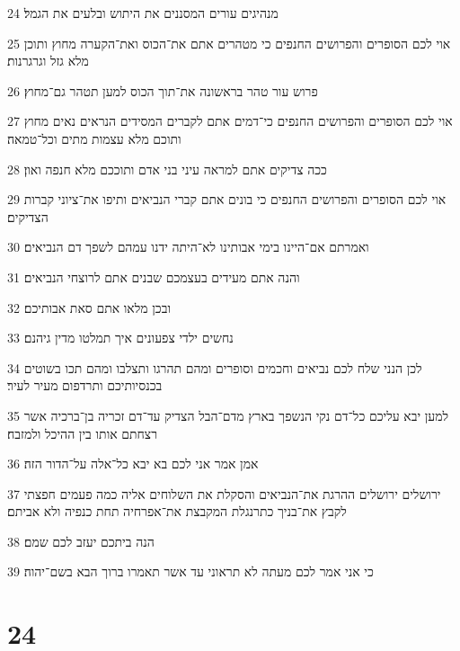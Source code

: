 \par 24 מנהיגים עורים המסננים את היתוש ובלעים את הגמל׃
\par 25 אוי לכם הסופרים והפרושים החנפים כי מטהרים אתם את־הכוס ואת־הקערה מחוץ ותוכן מלא גזל וגרגרנות׃
\par 26 פרוש עור טהר בראשונה את־תוך הכוס למען תטהר גם־מחוץ׃
\par 27 אוי לכם הסופרים והפרושים החנפים כי־דמים אתם לקברים המסידים הנראים נאים מחוץ ותוכם מלא עצמות מתים וכל־טמאה׃
\par 28 ככה צדיקים אתם למראה עיני בני אדם ותוככם מלא חנפה ואון׃
\par 29 אוי לכם הסופרים והפרושים החנפים כי בונים אתם קברי הנביאים ותיפו את־ציוני קברות הצדיקים׃
\par 30 ואמרתם אם־היינו בימי אבותינו לא־היתה ידנו עמהם לשפך דם הנביאים׃
\par 31 והנה אתם מעידים בעצמכם שבנים אתם לרוצחי הנביאים׃
\par 32 ובכן מלאו אתם סאת אבותיכם׃
\par 33 נחשים ילדי צפעונים איך תמלטו מדין גיהנם׃
\par 34 לכן הנני שלח לכם נביאים וחכמים וסופרים ומהם תהרגו ותצלבו ומהם תכו בשוטים בכנסיותיכם ותרדפום מעיר לעיר׃
\par 35 למען יבא עליכם כל־דם נקי הנשפך בארץ מדם־הבל הצדיק עד־דם זכריה בן־ברכיה אשר רצחתם אותו בין ההיכל ולמזבח׃
\par 36 אמן אמר אני לכם בא יבא כל־אלה על־הדור הזה׃
\par 37 ירושלים ירושלים ההרגת את־הנביאים והסקלת את השלוחים אליה כמה פעמים חפצתי לקבץ את־בניך כתרנגלת המקבצת את־אפרחיה תחת כנפיה ולא אביתם׃
\par 38 הנה ביתכם יעזב לכם שמם׃
\par 39 כי אני אמר לכם מעתה לא תראוני עד אשר תאמרו ברוך הבא בשם־יהוה׃

\chapter{24}

